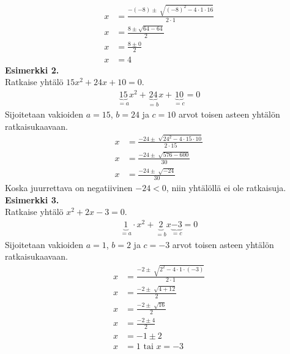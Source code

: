 \begin{align*}
x&=\frac{-(-8)\pm \sqrt[]{(-8)^2-4\cdot 1 \cdot 16}}{2 \cdot 1} \\
x&=\frac{8 \pm \sqrt{64- 64}}{2} \\
x&=\frac{8 \pm 0}{2} \\
x&=4
\end{align*}
\textbf{Esimerkki 2.} \\
Ratkaise yhtälö $15x^2+24x+10=0$.
\begin{align*}
\underbrace{15}_{=a}x^2+\underbrace{24}_{=b}x+\underbrace{10}_{=c}=0 
\end{align*}
Sijoitetaan vakioiden $a=15$, $b=24$ ja $c=10$ arvot toisen asteen yhtälön ratkaisukaavaan.
\begin{align*}
x&=\frac{-24 \pm \sqrt[]{24^2-4 \cdot 15 \cdot 10}}{2 \cdot 15} \\
x&=\frac{-24 \pm \sqrt[]{576-600}}{30} \\
x&=\frac{-24 \pm \sqrt[]{-24}}{30}
\end{align*}
Koska juurrettava on negatiivinen $-24<0$, niin yhtälöllä ei ole ratkaisuja. \\ 
\textbf{Esimerkki 3.} \\
Ratkaise yhtälö $x^2+2x-3=0$. 
\begin{align*}
\underbrace{1}_{=a} \cdot x^2+\underbrace{2}_{=b}x\underbrace{-3}_{=c}=0 
\end{align*}
Sijoitetaan vakioiden $a=1$, $b=2$ ja $c=-3$ arvot toisen asteen yhtälön ratkaisukaavaan.
\begin{align*}
x&=\frac{-2 \pm \sqrt[]{2^2-4 \cdot 1 \cdot (-3)}}{2 \cdot 1} \\
x&=\frac{-2 \pm \sqrt[]{4+12}}{2} \\
x&=\frac{-2 \pm \sqrt[]{16}}{2} \\
x&=\frac{-2 \pm 4}{2} \\
x&=-1 \pm 2 \\
x&=1 \text{ tai } x=-3 \\
\end{align*}


